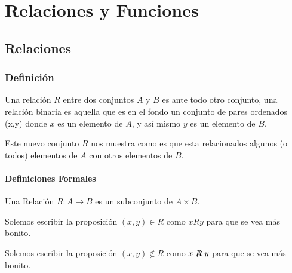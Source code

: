 \documentclass[12pt, fleqn]{report}                             %
\begin{document}
\part{Relaciones y Funciones}



    \chapter{Relaciones}
        \clearpage

        \section{Definición}

            Una relación $R$ entre dos conjuntos $A$ y $B$ es ante todo otro conjunto, una relación binaria es aquella
            que es en el fondo un conjunto de pares ordenados (x,y) donde $x$ es un elemento de $A$, y así mismo
            $y$ es un elemento de $B$.

            Este nuevo conjunto $R$ nos muestra como es que esta relacionados algunos (o todos) elementos de $A$ con
            otros elementos de $B$.



            \subsection*{Definiciones Formales}

                Una Relación $R: A \to B$ es un subconjunto de $A \times B$.

                Solemos escribir la proposición $(x, y) \in R$ como $x R y$ para que se vea más bonito.

                Solemos escribir la proposición $(x, y) \notin R$ como $x\centernot{R}y$ para que se vea más bonito.
\end{document}
